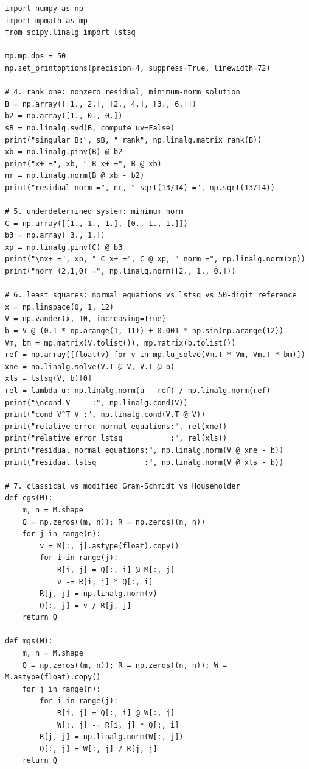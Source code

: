 \begin{lab}
\begin{verbatim}
import numpy as np
import mpmath as mp
from scipy.linalg import lstsq

mp.mp.dps = 50
np.set_printoptions(precision=4, suppress=True, linewidth=72)

# 4. rank one: nonzero residual, minimum-norm solution
B = np.array([[1., 2.], [2., 4.], [3., 6.]])
b2 = np.array([1., 0., 0.])
sB = np.linalg.svd(B, compute_uv=False)
print("singular B:", sB, " rank", np.linalg.matrix_rank(B))
xb = np.linalg.pinv(B) @ b2
print("x+ =", xb, " B x+ =", B @ xb)
nr = np.linalg.norm(B @ xb - b2)
print("residual norm =", nr, " sqrt(13/14) =", np.sqrt(13/14))

# 5. underdetermined system: minimum norm
C = np.array([[1., 1., 1.], [0., 1., 1.]])
b3 = np.array([3., 1.])
xp = np.linalg.pinv(C) @ b3
print("\nx+ =", xp, " C x+ =", C @ xp, " norm =", np.linalg.norm(xp))
print("norm (2,1,0) =", np.linalg.norm([2., 1., 0.]))

# 6. least squares: normal equations vs lstsq vs 50-digit reference
x = np.linspace(0, 1, 12)
V = np.vander(x, 10, increasing=True)
b = V @ (0.1 * np.arange(1, 11)) + 0.001 * np.sin(np.arange(12))
Vm, bm = mp.matrix(V.tolist()), mp.matrix(b.tolist())
ref = np.array([float(v) for v in mp.lu_solve(Vm.T * Vm, Vm.T * bm)])
xne = np.linalg.solve(V.T @ V, V.T @ b)
xls = lstsq(V, b)[0]
rel = lambda u: np.linalg.norm(u - ref) / np.linalg.norm(ref)
print("\ncond V     :", np.linalg.cond(V))
print("cond V^T V :", np.linalg.cond(V.T @ V))
print("relative error normal equations:", rel(xne))
print("relative error lstsq           :", rel(xls))
print("residual normal equations:", np.linalg.norm(V @ xne - b))
print("residual lstsq           :", np.linalg.norm(V @ xls - b))

# 7. classical vs modified Gram-Schmidt vs Householder
def cgs(M):
    m, n = M.shape
    Q = np.zeros((m, n)); R = np.zeros((n, n))
    for j in range(n):
        v = M[:, j].astype(float).copy()
        for i in range(j):
            R[i, j] = Q[:, i] @ M[:, j]
            v -= R[i, j] * Q[:, i]
        R[j, j] = np.linalg.norm(v)
        Q[:, j] = v / R[j, j]
    return Q

def mgs(M):
    m, n = M.shape
    Q = np.zeros((m, n)); R = np.zeros((n, n)); W = M.astype(float).copy()
    for j in range(n):
        for i in range(j):
            R[i, j] = Q[:, i] @ W[:, j]
            W[:, j] -= R[i, j] * Q[:, i]
        R[j, j] = np.linalg.norm(W[:, j])
        Q[:, j] = W[:, j] / R[j, j]
    return Q


\end{verbatim}
\end{lab}
